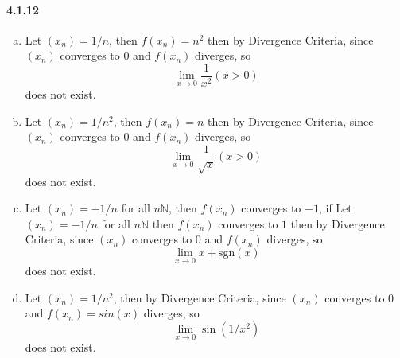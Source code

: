 \documentclass[11pt]{article}
\begin{document}
	\paragraph{4.1.12}
	\begin{enumerate}[(a)]
		\item Let $(x_n) = 1/n$, then $f(x_n) = n^2$ then by Divergence Criteria, since $(x_n)$ converges to $0$ and $f(x_n)$ diverges, so 
			\[\lim_{x \rightarrow 0} \frac{1}{x^2} (x > 0)\]
		does not exist. 
		\item Let $(x_n) = 1/n^2$, then $f(x_n) = n$ then by Divergence Criteria, since $(x_n)$ converges to $0$ and $f(x_n)$ diverges, so 
			\[\lim_{x \rightarrow 0} \frac{1}{\sqrt{x}} (x > 0)\]
		does not exist. 
		\item Let $(x_n) = -1/n$ for all $n \mathbb{N}$, then $f(x_n)$ converges to $-1$, if Let $(x_n) = -1/n$ for all $n \mathbb{N}$ then $f(x_n)$ converges to $1$ then by Divergence Criteria, since $(x_n)$ converges to $0$ and $f(x_n)$ diverges, so 
			\[\lim_{x \rightarrow 0} x + \text{sgn}(x)\]
		does not exist.
		\item Let $(x_n) = 1/n^2$, then  by Divergence Criteria, since $(x_n)$ converges to $0$ and $f(x_n) = sin(x)$ diverges, so 
			\[\lim_{x \rightarrow 0} \sin(1/x^2)\]
			does not exist.
		\end{enumerate}
\end{document}
